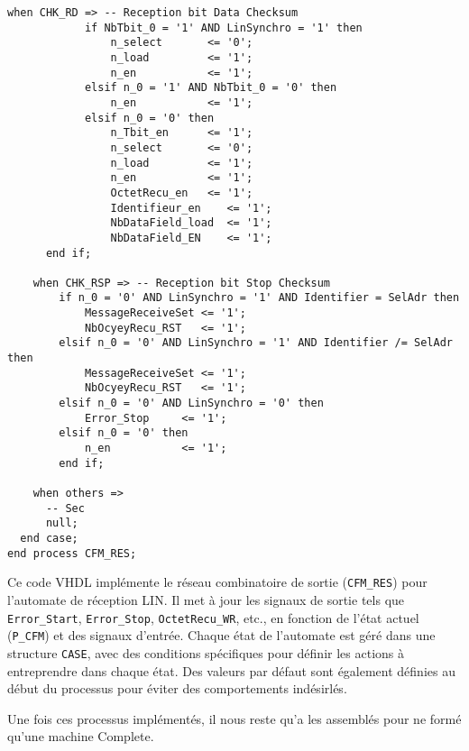 \begin{lstlisting}[style=VHDLStyle, caption={Réseau Combinatoire de Sortie Reception Trame}]
    when CHK_RD => -- Reception bit Data Checksum
    		if NbTbit_0 = '1' AND LinSynchro = '1' then
                n_select       <= '0';
                n_load         <= '1';
                n_en           <= '1';
    		elsif n_0 = '1' AND NbTbit_0 = '0' then
                n_en           <= '1';
    		elsif n_0 = '0' then
                n_Tbit_en      <= '1';
                n_select       <= '0';
                n_load         <= '1';
                n_en           <= '1';
                OctetRecu_en   <= '1';
                Identifieur_en    <= '1';
                NbDataField_load  <= '1';
                NbDataField_EN    <= '1';
      end if;  
                
    when CHK_RSP => -- Reception bit Stop Checksum
        if n_0 = '0' AND LinSynchro = '1' AND Identifier = SelAdr then
            MessageReceiveSet <= '1';
            NbOcyeyRecu_RST   <= '1';
        elsif n_0 = '0' AND LinSynchro = '1' AND Identifier /= SelAdr then
            MessageReceiveSet <= '1';
            NbOcyeyRecu_RST   <= '1';
        elsif n_0 = '0' AND LinSynchro = '0' then
            Error_Stop     <= '1';
        elsif n_0 = '0' then
            n_en           <= '1';
        end if;                         
        
    when others =>
      -- Sec 
      null;
  end case;
end process CFM_RES;
\end{lstlisting}

Ce code VHDL implémente le réseau combinatoire de sortie (\texttt{CFM\_RES}) pour l’automate de réception LIN.
Il met à jour les signaux de sortie tels que \texttt{Error\_Start}, \texttt{Error\_Stop}, \texttt{OctetRecu\_WR}, etc., en fonction de l’état actuel (\texttt{P\_CFM}) et des signaux d’entrée.
Chaque état de l’automate est géré dans une structure \texttt{CASE}, avec des conditions spécifiques pour définir les actions à entreprendre dans chaque état.
Des valeurs par défaut sont également définies au début du processus pour éviter des comportements indésirlés.  
\newline

Une fois ces processus implémentés, il nous reste qu'a les assemblés pour ne formé qu'une machine Complete.
\newline


